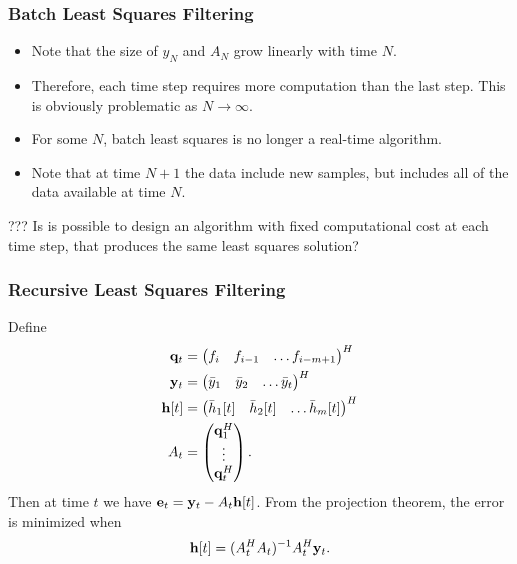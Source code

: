 \documentclass{beamer}
\begin{document}
\begin{frame}\frametitle{Batch Least Squares Filtering}
	\begin{itemize}
		\item Note that the size of $y_N$ and $A_N$ grow linearly with time $N$.  
		\item Therefore, each time step requires more computation than the last step.  This is obviously problematic as $N\to\infty$.  
		\item For some $N$, batch least squares is no longer a real-time algorithm.
		\item Note that at time $N+1$ the data include new samples, but includes all of the data available at time $N$.
	\end{itemize}
	
	\vspace{1cm}
	
	{\color{red} ???  Is is possible to design an algorithm with fixed computational cost at each time step, that produces the same least squares solution?}
\end{frame}

\begin{frame}\frametitle{Recursive Least Squares Filtering}
	Define
	\begin{align*}
		\mathbf{q}_t &= \begin{pmatrix} f_i & f_{i-1} & \dots f_{i-m+1} \end{pmatrix}^H \\
		\mathbf{y}_t &= \begin{pmatrix} \bar{y}_1 & \bar{y}_2 & \dots \bar{y}_t \end{pmatrix}^H \\
		\mathbf{h}[t] &= \begin{pmatrix} \bar{h}_1[t] & \bar{h}_2[t] & \dots \bar{h}_m[t] \end{pmatrix}^H \\
		A_t &= \begin{pmatrix} \mathbf{q}^H_1 \\ \vdots \\ \mathbf{q}^H_t\end{pmatrix}.
	\end{align*}
	Then at time $t$ we have $\mathbf{e}_t = \mathbf{y}_t - A_t \mathbf{h}[t]$.  From the projection theorem, the error is minimized when
	\[
		\mathbf{h}[t] = (A^H_t A_t)^{-1} A_t^H \mathbf{y}_t.
	\]
\end{frame}
\end{document}
